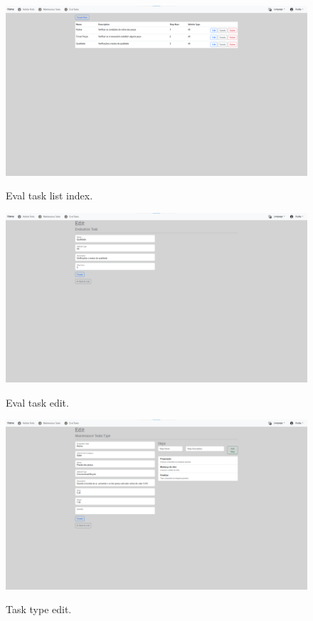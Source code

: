 \clearpage

\begin{figure}[htbp]
  \caption{Eval task list index.}
  \centering
  \includegraphics[width=\textwidth]{figs/Implementation/dealershipAdmin/evalIndex}
  \label{fig:evalIndex}
\end{figure}
 
\begin{figure}[htbp] 
  \caption{Eval task edit.}
  \centering
  \includegraphics[width=\textwidth]{figs/Implementation/dealershipAdmin/evalEdit}
  \label{fig:evalEdit} 
\end{figure}


\begin{figure}[htbp]
  \caption{Task type edit.}
  \centering
  \includegraphics[width=\textwidth]{figs/Implementation/dealershipAdmin/taskEdit}
  \label{fig:taskEdit}
\end{figure}


